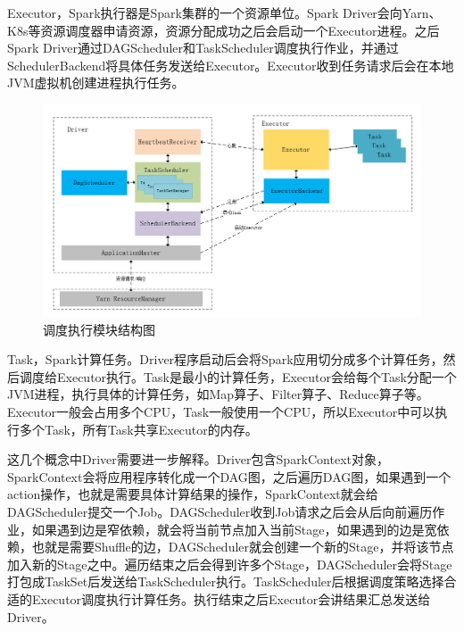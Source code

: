 Executor，Spark执行器是Spark集群的一个资源单位。Spark Driver会向Yarn、K8s等资源调度器申请资源，资源分配成功之后会启动一个Executor进程。之后Spark Driver通过DAGScheduler和TaskScheduler调度执行作业，并通过SchedulerBackend将具体任务发送给Executor。Executor收到任务请求后会在本地JVM虚拟机创建进程执行任务。

\begin{figure}
    \centering
    \includegraphics[width=1\textwidth]{Img/spark-scheduler-detail.png}
    \caption{调度执行模块结构图}
    \label{fig:scheduler-models}
\end{figure}

Task，Spark计算任务。Driver程序启动后会将Spark应用切分成多个计算任务，然后调度给Executor执行。Task是最小的计算任务，Executor会给每个Task分配一个JVM进程，执行具体的计算任务，如Map算子、Filter算子、Reduce算子等。Executor一般会占用多个CPU，Task一般使用一个CPU，所以Executor中可以执行多个Task，所有Task共享Executor的内存。

这几个概念中Driver需要进一步解释。Driver包含SparkContext对象，SparkContext会将应用程序转化成一个DAG图，之后遍历DAG图，如果遇到一个action操作，也就是需要具体计算结果的操作，SparkContext就会给DAGScheduler提交一个Job。DAGScheduler收到Job请求之后会从后向前遍历作业，如果遇到边是窄依赖，就会将当前节点加入当前Stage，如果遇到的边是宽依赖，也就是需要Shuffle的边，DAGScheduler就会创建一个新的Stage，并将该节点加入新的Stage之中。遍历结束之后会得到许多个Stage，DAGScheduler会将Stage打包成TaskSet后发送给TaskScheduler执行。TaskScheduler后根据调度策略选择合适的Executor调度执行计算任务。执行结束之后Executor会讲结果汇总发送给Driver。

